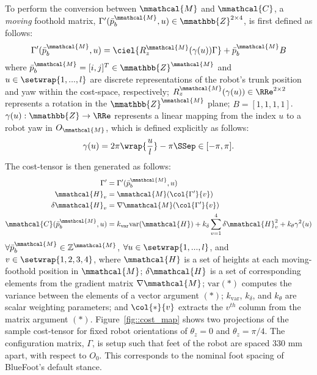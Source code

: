 			To perform the conversion between $\mmathcal{M}$ and $\mmathcal{C}$, a \emph{moving} foothold matrix, $\Gamma'(\bar{p}^{\mmathcal{M}}_{b},u) \in \mmathbb{Z}^{2\times4}$, is first defined as follows:
				\begin{equation}
					\Gamma'(\bar{p}^{\mmathcal{M}}_{b},u) = \ciel{ R_{z}^{\mmathcal{M}}(\gamma(u))\Gamma } + \bar{p}^{\mmathcal{M}}_{b} B \\
					\label{eq::rel_feet}
				\end{equation}
			where  $\bar{p}^{\mmathcal{M}}_{b} = [i,j]^{T}\in\mmathbb{Z}^{\mmathcal{M}}$ and $u \in \setwrap{1,...,l}$ are discrete representations of the robot's trunk position and yaw within the cost-space, respectively; $R_{z}^{\mmathcal{M}}(\gamma(u))\in\RRe^{2\times2}$ represents a rotation in the $\mmathbb{Z}^{\mmathcal{M}}$ plane; $B = [1,1,1,1]$. ${\gamma(u) : \mmathbb{Z} \rightarrow \RRe }$ represents a linear mapping from the index $u$ to a robot yaw in $O_{\mmathcal{M}}$, which is defined explicitly as follows:
				\begin{equation} 
					\gamma(u) = 2\pi\wrap{\frac{u}{l}} - \pi \SSep \in [-\pi,\pi].
					\label{eq::gamma}
				\end{equation}
			The cost-tensor is then generated as follows:
				\begin{equation}
					\begin{split}
						\Gamma'	 					&= \Gamma'(\bar{p}^{\mmathcal{M}}_{b},u)  \\
						\mmathcal{H}_{v} 			&=		\mmathcal{M}(\col{\Gamma'}{v})	 \\
						\delta \mmathcal{H}_{v} 	&= 		\nabla \mmathcal{M}(\col{\Gamma'}{v}) \\
						\mmathcal{C}(\bar{p}^{\mmathcal{M}}_{b},u) 	&= k_{\text{var}} \text{var}(\mmathcal{H}) + k_{\delta}\sum_{v=1}^{4} \delta \mmathcal{H}_{v}^{2} + k_{\theta} \gamma^{2}(u) 
					\end{split}
				\end{equation}
			$\forall \bar{p}^{\mmathcal{M}}_{b} \in \mathbb{Z}^{\mmathcal{M}}$, $\forall u \in \setwrap{1,...,l}$, and  $v \in \setwrap{1,2,3,4}$, where $\mmathcal{H}$ is a set of heights at each moving-foothold position in $\mmathcal{M}$; $\delta\mmathcal{H}$ is a set of corresponding elements from the gradient matrix $\nabla \mmathcal{M}$; $\text{var}(*)$ computes the variance between the elements of a vector argument $(*)$; $k_{\text{var}}$, $k_{\delta}$, and $k_{\theta}$ are scalar weighting parameters; and $\col{*}{v}$ extracts the $v^{th}$ column from the matrix argument $(*)$. Figure~\ref{fig::cost_map} shows two projections of the sample cost-tensor for fixed robot orientations of $\theta_{z}=0$ and $\theta_{z}=\pi/4$. The configuration matrix, $\Gamma$, is setup such that feet of the robot are spaced $330\text{ mm}$ apart, with respect to $O_{0}$. This corresponds to the nominal foot spacing of BlueFoot's default stance.

